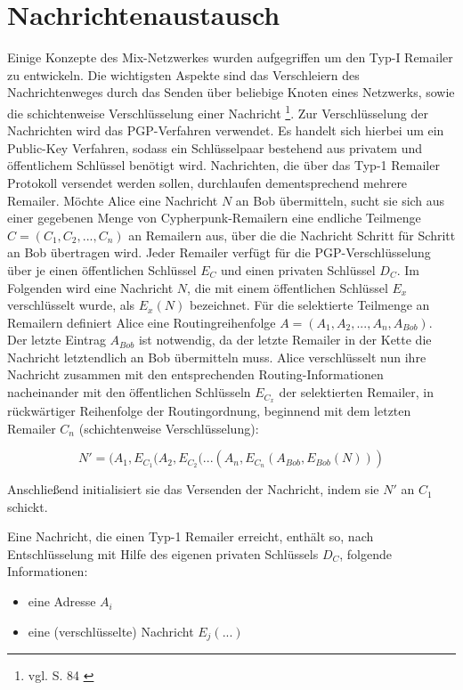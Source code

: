 \section{Nachrichtenaustausch}
Einige Konzepte des Mix-Netzwerkes wurden aufgegriffen um den Typ-I Remailer zu entwickeln. Die wichtigsten Aspekte sind das Verschleiern des Nachrichtenweges durch das Senden über beliebige Knoten eines Netzwerks, sowie die schichtenweise Verschlüsselung einer Nachricht \footnote{vgl. S. 84 \cite{sambleben2013informationstechnologie}}. Zur Verschlüsselung der Nachrichten wird das PGP-Verfahren verwendet. Es handelt sich hierbei um ein Public-Key Verfahren, sodass ein Schlüsselpaar bestehend aus privatem und öffentlichem Schlüssel benötigt wird.
Nachrichten, die über das Typ-1 Remailer Protokoll versendet werden sollen, durchlaufen dementsprechend mehrere Remailer. Möchte Alice eine Nachricht \(N\) an Bob übermitteln, sucht sie sich aus einer gegebenen Menge von Cypherpunk-Remailern eine endliche Teilmenge \(C = (C_1, C_2, ..., C_n)\) an Remailern aus, über die die Nachricht Schritt für Schritt an Bob übertragen wird. Jeder Remailer verfügt für die PGP-Verschlüsselung über je einen öffentlichen Schlüssel \(E_C\) und einen privaten Schlüssel \(D_C\). Im Folgenden wird eine Nachricht \(N\), die mit einem öffentlichen Schlüssel \(E_x\) verschlüsselt wurde, als \(E_x(N)\) bezeichnet. Für die selektierte Teilmenge an Remailern definiert Alice eine Routingreihenfolge \(A = (A_1, A_2, ..., A_n, A_{Bob})\). Der letzte Eintrag \(A_{Bob}\) ist notwendig, da der letzte Remailer in der Kette die Nachricht letztendlich an Bob übermitteln muss.
Alice verschlüsselt nun ihre Nachricht zusammen mit den entsprechenden Routing-Informationen nacheinander mit den öffentlichen Schlüsseln \(E_{C_x}\) der selektierten Remailer, in rückwärtiger Reihenfolge der Routingordnung, beginnend mit dem letzten Remailer \(C_n\) (schichtenweise Verschlüsselung):

\begin{equation}
N' = (A_1, E_{C_1}(A_2, E_{C_2} (... (A_n,  E_{C_n}(A_{Bob}, E_{Bob}(N)))
\end{equation}

Anschließend initialisiert sie das Versenden der Nachricht, indem sie \(N'\) an \(C_1\) schickt.

Eine Nachricht, die einen Typ-1 Remailer erreicht, enthält so, nach Entschlüsselung mit Hilfe des eigenen privaten Schlüssels \(D_C\), folgende Informationen:
\begin{itemize}
\item eine Adresse \(A_i\)
\item eine (verschlüsselte) Nachricht \(E_j(...)\)
\end{itemize}

